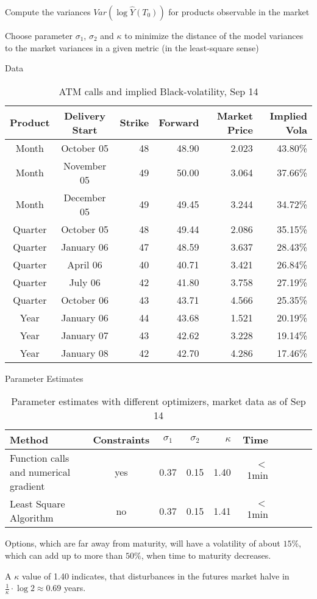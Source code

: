 	Compute the variances $Var(\log\hat{Y}(T_0))$ for products observable in the market


	Choose parameter $\sigma_1$, $\sigma_2$ and $\kappa$ to minimize the distance of the model variances
to the market variances in a given metric (in the least-square sense)







{Data}
{\small \begin{table}[btp]
\begin{center}
\begin{tabular}{ccrrrr}
Product     & Delivery Start    & Strike    &   Forward & Market Price  &Implied Vola \\
\hline
Month   &October 05     &48 &48.90&2.023&43.80\%\\
Month   &November 05        &49 &50.00&3.064&37.66\%\\
Month   &December 05        &49 &49.45&3.244&34.72\%\\
\hline
Quarter & October 05        &48 &49.44&2.086&35.15\%\\
Quarter & January 06        &47 &48.59&3.637&28.43\%\\
Quarter & April 06          &40 &40.71&3.421&26.84\%\\
Quarter & July 06           &42 &41.80&3.758&27.19\%\\
Quarter & October 06        &43 &43.71&4.566&25.35\%\\
\hline
Year    &January 06     &44 &43.68&1.521&20.19\%\\
Year    &January 07     &43 &42.62&3.228&19.14\%\\
Year    &January 08     &42 &42.70&4.286&17.46\%\\
\end{tabular}
\caption{ATM calls and implied Black-volatility, Sep 14}
\label{fig:data}
\end{center}
\end{table}
}

{Parameter Estimates}
 \begin{table}[btp]
 \begin{center}
\begin{tabular}{p{4cm}cccrrrrcc}
Method  &Constraints    &$\sigma_1$ &$\sigma_2$ &$\kappa$   &Time&\\
\hline
Function calls and numerical gradient       &yes            &0.37       &0.15       &1.40       &$<$1min&\\
Least Square Algorithm  &no&0.37&0.15&1.41      &$<$1min&\\
\end{tabular}
\caption{Parameter estimates with different optimizers, market data as of Sep 14}
\label{fig:estimates18}
\end{center}
\end{table}

Options, which are far away from maturity, will have a volatility of about $15\%$,
which can add up to more than $50\%$, when time to maturity decreases.

A $\kappa$ value of 1.40 indicates, that disturbances in the futures market
halve in $\frac{1}{\kappa}\cdot \log 2 \approx 0.69$ years.


